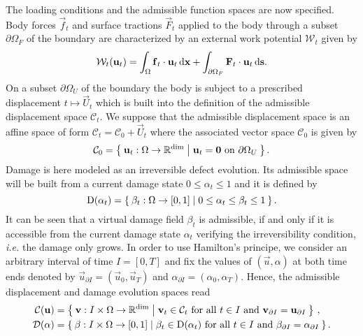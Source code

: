 The loading conditions and the admissible function spaces are now specified. Body forces $\vec{f}_t$ and surface tractions $\vec{F}_t$ applied to the body through a subset $\partial\Omega_F$ of the boundary are characterized by an external work potential $\mathcal{W}_t$ given by
\begin{equation} \label{eq:power}
\mathcal{W}_t(\vec{u}_t)=\int_\Omega\vec{f}_t\cdot\vec{u}_t\dx+\int_{\partial\Omega_F}\vec{F}_t\cdot\vec{u}_t\D{\vec{s}}.
\end{equation}
On a subset $\partial\Omega_U$ of the boundary the body is subject to a prescribed displacement $t\mapsto \vec{U}_t$ which is built into the definition of the admissible displacement space $\mathcal{C}_t$. We suppose that the admissible displacement space is an affine space of form $\mathcal{C}_t=\mathcal{C}_0+\vec{U}_t$ where the associated vector space $\mathcal{C}_0$ is given by
\[
\mathcal{C}_0=\set{\vec{u}_t:\Omega\to\mathbb{R}^\mathrm{dim}|\vec{u}_t=\vec{0}\text{ on }\partial\Omega_U}.
\]
Damage is here modeled as an irreversible defect evolution. Its admissible space will be built from a current damage state $0\leq\alpha_t\leq 1$ and it is defined by
\begin{equation} \label{eq:Dalphat}
\mathrm{D}(\alpha_t)=\Set{\beta_t:\Omega\to[0,1]|0\leq\alpha_t\leq\beta_t\leq 1}.
\end{equation}
It can be seen that a virtual damage field $\beta_t$ is admissible, if and only if it is accessible from the current damage state $\alpha_t$ verifying the irreversibility condition, \emph{i.e.} the damage only grows. In order to use Hamilton's principe, we consider an arbitrary interval of time $I=[0,T]$ and fix the values of $(\vec{u},\alpha)$ at both time ends denoted by $\vec{u}_{\partial I}=(\vec{u}_0,\vec{u}_T)$ and $\alpha_{\partial I}=(\alpha_0,\alpha_T)$. Hence, the admissible displacement and damage evolution spaces read
\begin{align}
\mathcal{C}(\vec{u}) &= \set{\vec{v}:I\times\Omega\to\mathbb{R}^\mathrm{dim}|\vec{v}_t\in\mathcal{C}_t\text{ for all $t\in I$ and }\vec{v}_{\partial I}=\vec{u}_{\partial I}}\,, \label{eq:Du} \\
\mathcal{D}(\alpha) &= \set{\beta:I\times\Omega\to[0,1]|\beta_t\in\mathrm{D}(\alpha_t)\text{ for all $t\in I$ and }\beta_{\partial I}=\alpha_{\partial I}}. \label{eq:Dalpha}
\end{align}

